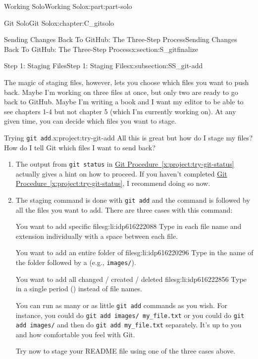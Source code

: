 \documentclass[oneside,10pt,]{book}
\newcommand{\xreffont}{\relax}
\newcommand{\mono}[1]{\texttt{#1}}
\newcommand{\kbd}[1]{\keys{{#1}}}
\begin{document}
\begin{partptx}{Working Solo}{}{Working Solo}{}{}{x:part:part-solo}
\begin{chapterptx}{Git Solo}{}{Git Solo}{}{}{x:chapter:C_gitsolo}
\begin{sectionptx}{Sending Changes Back To GitHub: The Three-Step Process}{}{Sending Changes Back To GitHub: The Three-Step Process}{}{}{x:section:S_gitfinalize}
\begin{subsectionptx}{Step 1: Staging Files}{}{Step 1: Staging Files}{}{}{x:subsection:SS_git-add}
\par
The magic of staging files, however, lets you choose which files you want to push back. Maybe I'm working on three files at once, but only two are ready to go back to GitHub. Maybe I'm writing a book and I want my editor to be able to see chapters 1-4 but not chapter 5 (which I'm currently working on). At any given time, you can decide which files you want to stage.%
\begin{project}{Trying \mono{git add}.}{x:project:try-git-add}%
All this is great but how do I stage my files? How do I tell Git which files I want to send back?%
\begin{enumerate}[font=\bfseries,label=(\alph*),ref=\alph*]
\item{}The output from \mono{git status} in \hyperref[x:project:try-git-status]{Git Procedure~{\xreffont\ref{x:project:try-git-status}}} actually gives a hint on how to proceed. If you haven't completed \hyperref[x:project:try-git-status]{Git Procedure~{\xreffont\ref{x:project:try-git-status}}}, I recommend doing so now.%
\item{}The staging command is done with \mono{git add} and the command is followed by all the files you want to add. There are three cases with this command:%
\begin{descriptionlist}
\begin{dlimedium}{You want to add specific files}{g:li:idp616222088}%
Type in each file name and extension individually with a space between each file.%
\end{dlimedium}%
\begin{dlimedium}{You want to add an entire folder of files}{g:li:idp616220296}%
Type in the name of the folder followed by a \kbd{/} (e.g.\@, \mono{images/}).%
\end{dlimedium}%
\begin{dlimedium}{You want to add all changed \slash{} created \slash{} deleted files}{g:li:idp616222856}%
Type in a single period (\kbd{.}) instead of file names.%
\end{dlimedium}%
\end{descriptionlist}
%
\par
You can run as many or as little \mono{git add} commands as you wish. For instance, you could do \mono{git add images/ my\_file.txt} or you could do \mono{git add images/} and then do \mono{git add my\_file.txt} separately. It's up to you and how comfortable you feel with Git.%
\par
Try now to stage your README file using one of the three cases above.%

\end{enumerate}
\end{project}
\end{subsectionptx}
\end{sectionptx}
\end{chapterptx}
\end{partptx}
\end{document}
